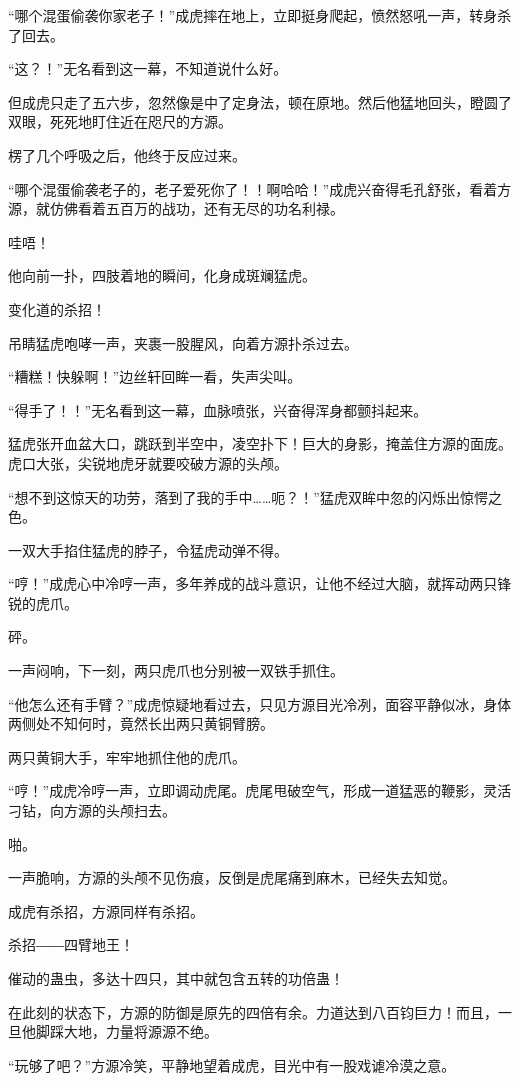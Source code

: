 \begin{this_body}
“哪个混蛋偷袭你家老子！”成虎摔在地上，立即挺身爬起，愤然怒吼一声，转身杀了回去。

“这？！”无名看到这一幕，不知道说什么好。

但成虎只走了五六步，忽然像是中了定身法，顿在原地。然后他猛地回头，瞪圆了双眼，死死地盯住近在咫尺的方源。

楞了几个呼吸之后，他终于反应过来。

“哪个混蛋偷袭老子的，老子爱死你了！！啊哈哈！”成虎兴奋得毛孔舒张，看着方源，就仿佛看着五百万的战功，还有无尽的功名利禄。

哇唔！

他向前一扑，四肢着地的瞬间，化身成斑斓猛虎。

变化道的杀招！

吊睛猛虎咆哮一声，夹裹一股腥风，向着方源扑杀过去。

“糟糕！快躲啊！”边丝轩回眸一看，失声尖叫。

“得手了！！”无名看到这一幕，血脉喷张，兴奋得浑身都颤抖起来。

猛虎张开血盆大口，跳跃到半空中，凌空扑下！巨大的身影，掩盖住方源的面庞。虎口大张，尖锐地虎牙就要咬破方源的头颅。

“想不到这惊天的功劳，落到了我的手中……呃？！”猛虎双眸中忽的闪烁出惊愕之色。

一双大手掐住猛虎的脖子，令猛虎动弹不得。

“哼！”成虎心中冷哼一声，多年养成的战斗意识，让他不经过大脑，就挥动两只锋锐的虎爪。

砰。

一声闷响，下一刻，两只虎爪也分别被一双铁手抓住。

“他怎么还有手臂？”成虎惊疑地看过去，只见方源目光冷冽，面容平静似冰，身体两侧处不知何时，竟然长出两只黄铜臂膀。

两只黄铜大手，牢牢地抓住他的虎爪。

“哼！”成虎冷哼一声，立即调动虎尾。虎尾甩破空气，形成一道猛恶的鞭影，灵活刁钻，向方源的头颅扫去。

啪。

一声脆响，方源的头颅不见伤痕，反倒是虎尾痛到麻木，已经失去知觉。

成虎有杀招，方源同样有杀招。

杀招――四臂地王！

催动的蛊虫，多达十四只，其中就包含五转的功倍蛊！

在此刻的状态下，方源的防御是原先的四倍有余。力道达到八百钧巨力！而且，一旦他脚踩大地，力量将源源不绝。

“玩够了吧？”方源冷笑，平静地望着成虎，目光中有一股戏谑冷漠之意。


\end{this_body}
